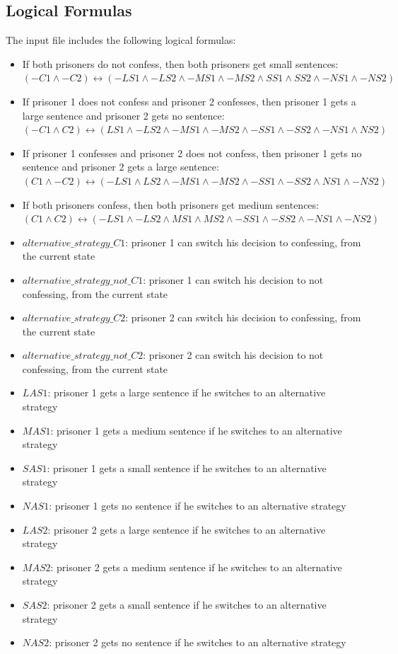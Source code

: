 \documentclass[a4paper,12pt]{report}
\begin{document}
\subsection{Logical Formulas}

The input file includes the following logical formulas:

\begin{itemize}
\item If both prisoners do not confess, then both prisoners get small sentences: \
$(-C1 \land -C2) \leftrightarrow (-LS1 \land -LS2 \land -MS1 \land -MS2 \land SS1 \land SS2 \land -NS1 \land -NS2)$
\item If prisoner 1 does not confess and prisoner 2 confesses, then prisoner 1 gets a large sentence and prisoner 2 gets no sentence: \
$(-C1 \land C2) \leftrightarrow (LS1 \land -LS2 \land -MS1 \land -MS2 \land -SS1 \land -SS2 \land -NS1 \land NS2)$
\item If prisoner 1 confesses and prisoner 2 does not confess, then prisoner 1 gets no sentence and prisoner 2 gets a large sentence: \
$(C1 \land -C2) \leftrightarrow (-LS1 \land LS2 \land -MS1 \land -MS2 \land -SS1 \land -SS2 \land NS1 \land -NS2)$
\item If both prisoners confess, then both prisoners get medium sentences: \
$(C1 \land C2) \leftrightarrow (-LS1 \land -LS2 \land MS1 \land MS2 \land -SS1 \land -SS2 \land -NS1 \land -NS2)$
\item $alternative\_strategy\_C1$: prisoner 1 can switch his decision to confessing, from the current state
\item $alternative\_strategy\_not\_C1$: prisoner 1 can switch his decision to not confessing, from the current state
\item $alternative\_strategy\_C2$: prisoner 2 can switch his decision to confessing, from the current state
\item $alternative\_strategy\_not\_C2$: prisoner 2 can switch his decision to not confessing, from the current state
\item $LAS1$: prisoner 1 gets a large sentence if he switches to an alternative strategy
\item $MAS1$: prisoner 1 gets a medium sentence if he switches to an alternative strategy
\item $SAS1$: prisoner 1 gets a small sentence if he switches to an alternative strategy
\item $NAS1$: prisoner 1 gets no sentence if he switches to an alternative strategy
\item $LAS2$: prisoner 2 gets a large sentence if he switches to an alternative strategy
\item $MAS2$: prisoner 2 gets a medium sentence if he switches to an alternative strategy
\item $SAS2$: prisoner 2 gets a small sentence if he switches to an alternative strategy
\item $NAS2$: prisoner 2 gets no sentence if he switches to an alternative strategy
\end{itemize}
\end{document}
